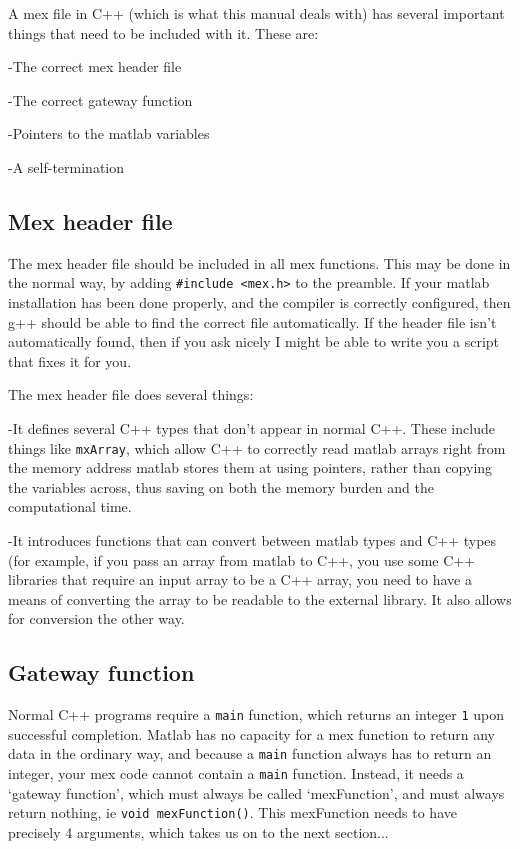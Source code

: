 \documentclass[12pt,a4paper]{article}
\begin{document}
A mex file in C++ (which is what this manual deals with) has several important things that need to be included with it. These are:

-The correct mex header file

-The correct gateway function

-Pointers to the matlab variables

-A self-termination

\subsection{Mex header file}

The mex header file should be included in all mex functions. This may be done in the normal way, by adding \texttt{\#include <mex.h>} to the preamble. If your matlab installation has been done properly, and the compiler is correctly configured, then g++ should be able to find the correct file automatically. If the header file isn't automatically found, then if you ask nicely I might be able to write you a script that fixes it for you.

The mex header file does several things:

-It defines several C++ types that don't appear in normal C++. These include things like \texttt{mxArray}, which allow C++ to correctly read matlab arrays right from the memory address matlab stores them at using pointers, rather than copying the variables across, thus saving on both the memory burden and the computational time.

-It introduces functions that can convert between matlab types and C++ types (for example, if you pass an array from matlab to C++, you use some C++ libraries that require an input array to be a C++ array, you need to have a means of converting the array to be readable to the external library. It also allows for conversion the other way.


\subsection{Gateway function}

Normal C++ programs require a \texttt{main} function, which returns an integer \texttt{1} upon successful completion. Matlab has no capacity for a mex function to return any data in the ordinary way, and because a \texttt{main} function always has to return an integer, your mex code cannot contain a \texttt{main} function. Instead, it needs a `gateway function', which must always be called `mexFunction', and must always return nothing, ie \texttt{\color{blue}void \color{black} mexFunction()}. This mexFunction needs to have precisely 4 arguments, which takes us on to the next section...
\end{document}
